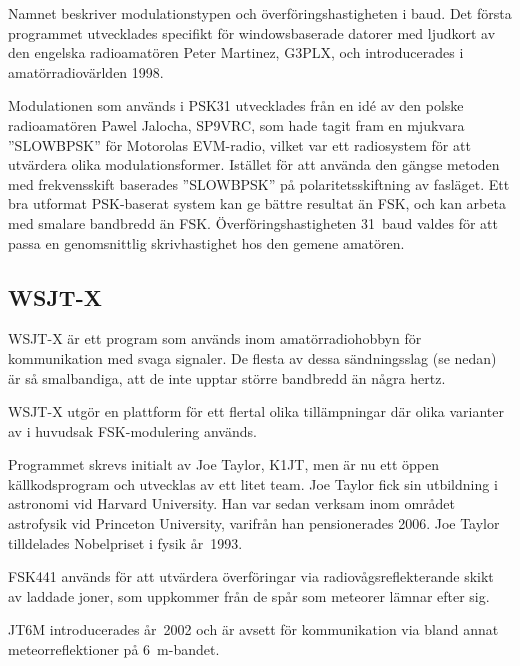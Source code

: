\begin{historiabox}
Namnet beskriver modulationstypen och överföringshastigheten i baud.
Det första programmet utvecklades specifikt för windowsbaserade datorer med
ljudkort av den engelska radioamatören Peter Martinez, G3PLX, och
introducerades i amatörradiovärlden 1998.
\end{historiabox}

Modulationen som används i PSK31 utvecklades från en idé av den polske
radioamatören Pawel Jalocha, SP9VRC, som hade tagit fram en mjukvara
''SLOWBPSK'' för Motorolas EVM-radio, vilket var ett radiosystem för att
utvärdera olika modulationsformer.
Istället för att använda den gängse metoden med frekvensskift baserades
''SLOWBPSK'' på polaritetsskiftning av fasläget.
Ett bra utformat PSK-baserat system kan ge bättre resultat än FSK, och kan
arbeta med smalare bandbredd än FSK.
Överföringshastigheten 31~baud valdes för att passa en genomsnittlig
skrivhastighet hos den gemene amatören.

\subsection{WSJT-X}

WSJT-X är ett program som används inom amatörradiohobbyn för kommunikation med
svaga signaler.
De flesta av dessa sändningsslag (se nedan) är så smalbandiga, att de inte
upptar större bandbredd än några hertz.

WSJT-X utgör en plattform för ett flertal olika tillämpningar där olika
varianter av i huvudsak FSK-modulering används.

\begin{historiabox}
Programmet skrevs initialt av Joe Taylor, K1JT, men är nu ett öppen
källkodsprogram och utvecklas av ett litet team.
Joe Taylor fick sin utbildning i astronomi vid Harvard University.
Han var sedan verksam inom området astrofysik vid Princeton University,
varifrån han pensionerades 2006.
Joe Taylor tilldelades Nobelpriset i fysik år~1993.
\end{historiabox}

FSK441 används för att utvärdera överföringar via radiovågsreflekterande skikt
av laddade joner, som uppkommer från de spår som meteorer lämnar efter sig.

JT6M introducerades år~2002 och är avsett för kommunikation via bland annat
meteorreflektioner på \qty{6}{\metre}-bandet.

